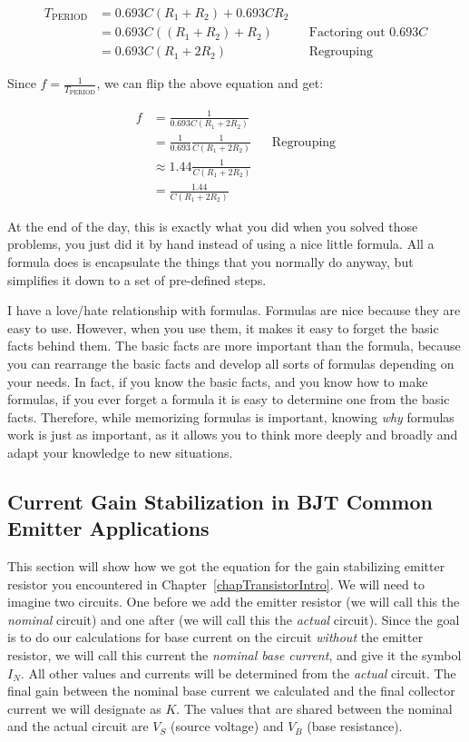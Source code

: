 \begin{align*}
T_{\text{PERIOD}} &= 0.693 C (R_1 + R_2) + 0.693 C R_2 \\
 &= 0.693 C((R_1 + R_2) + R_2) && \textrm{Factoring out $0.693 C$} \\
 &= 0.693 C(R_1 + 2 R_2) && \textrm{Regrouping}
\end{align*}

Since $f = \frac{1}{T_{\text{PERIOD}}}$, we can flip the above equation and get:

\begin{align*}
f &= \frac{1}{0.693 C(R_1 + 2 R_2)} \\
  &= \frac{1}{0.693}\frac{1}{C(R_1 + 2 R_2)} && \textrm{Regrouping} \\
  &\approx 1.44 \frac{1}{C(R_1 + 2 R_2)} \\
  &= \frac{1.44}{C(R_1 + 2 R_2)}
\end{align*}

At the end of the day, this is exactly what you did when you solved those problems, you just did it by hand instead of using a nice little formula.
All a formula does is encapsulate the things that you normally do anyway, but simplifies it down to a set of pre-defined steps.

I have a love/hate relationship with formulas.  
Formulas are nice because they are easy to use.
However, when you use them, it makes it easy to forget the basic facts behind them.
The basic facts are more important than the formula, because you can rearrange the basic facts and develop all sorts of formulas depending on your needs.
In fact, if you know the basic facts, and you know how to make formulas, if you ever forget a formula it is easy to determine one from the basic facts.
Therefore, while memorizing formulas is important, knowing \emph{why} formulas work is just as important, as it allows you to think more deeply and broadly and adapt your knowledge to new situations.

\iffalse
\subsection{Current Gain Stabilization in BJT Common Emitter Applications}
\label{eqGainStabilizingEmitterResistorDCCommonEmitter}


This section will show how we got the equation for the gain stabilizing emitter resistor you encountered in Chapter~\ref{chapTransistorIntro}.
We will need to imagine two circuits.
One before we add the emitter resistor (we will call this the \emph{nominal} circuit) and one after (we will call this the \emph{actual} circuit).
Since the goal is to do our calculations for base current on the circuit \emph{without} the emitter resistor, we will call this current the \emph{nominal base current}, and give it the symbol $I_N$.
All other values and currents will be determined from the \emph{actual} circuit.
The final gain between the nominal base current we calculated and the final collector current we will designate as $K$.
The values that are shared between the nominal and the actual circuit are $V_S$ (source voltage) and $V_B$ (base resistance).

